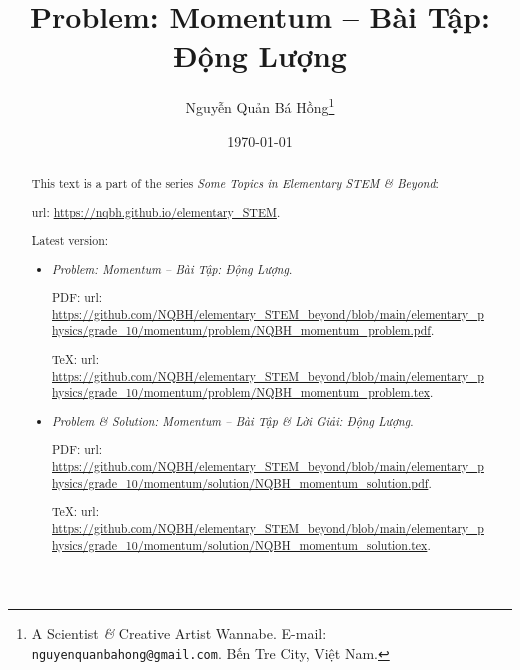 \documentclass{article}
\title{Problem: Momentum -- Bài Tập: Động Lượng}
\author{Nguyễn Quản Bá Hồng\footnote{A Scientist {\it\&} Creative Artist Wannabe. E-mail: {\tt nguyenquanbahong@gmail.com}. Bến Tre City, Việt Nam.}}
\date{\today}
\begin{document}
\maketitle
\begin{abstract}
	This text is a part of the series {\it Some Topics in Elementary STEM \& Beyond}:
	
	{\sc url}: \url{https://nqbh.github.io/elementary_STEM}.
	
	Latest version:
	\begin{itemize}
		\item {\it Problem: Momentum -- Bài Tập: Động Lượng}.
		
		PDF: {\sc url}: \url{https://github.com/NQBH/elementary_STEM_beyond/blob/main/elementary_physics/grade_10/momentum/problem/NQBH_momentum_problem.pdf}.
		
		\TeX: {\sc url}: \url{https://github.com/NQBH/elementary_STEM_beyond/blob/main/elementary_physics/grade_10/momentum/problem/NQBH_momentum_problem.tex}.
		\item {\it Problem \& Solution: Momentum -- Bài Tập \& Lời Giải: Động Lượng}.
		
		PDF: {\sc url}: \url{https://github.com/NQBH/elementary_STEM_beyond/blob/main/elementary_physics/grade_10/momentum/solution/NQBH_momentum_solution.pdf}.
		
		\TeX: {\sc url}: \url{https://github.com/NQBH/elementary_STEM_beyond/blob/main/elementary_physics/grade_10/momentum/solution/NQBH_momentum_solution.tex}.
	\end{itemize}
\end{abstract}
\tableofcontents

\end{document}
